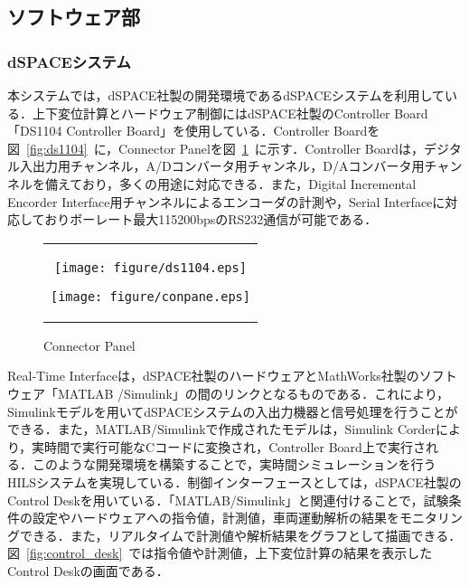 \documentclass[a4paper,12pt]{article_vdlab_sotsuron}
\begin{document}
\newpage
\subsection{ソフトウェア部}
\subsubsection{dSPACEシステム}
本システムでは，dSPACE社製の開発環境であるdSPACEシステムを利用している．上下変位計算とハードウェア制御にはdSPACE社製のController Board「DS1104 Controller Board」を使用している．Controller Boardを図~\ref{fig:ds1104}~に，Connector Panelを図~\ref{fig:conpane}~に示す．Controller Boardは，デジタル入出力用チャンネル，A/Dコンバータ用チャンネル，D/Aコンバータ用チャンネルを備えており，多くの用途に対応できる．また，Digital Incremental Encorder Interface用チャンネルによるエンコーダの計測や，Serial Interfaceに対応しておりボーレート最大115200bpsのRS232通信が可能である．

\vspace{10mm}
\begin{figure}[h]
    \begin{tabular}{c}
      \begin{minipage}{0.5\hsize}
	\begin{center}
	  \texttt{[image: figure/ds1104.eps]}
	  \caption{Controller Borad\cite{6}}
	  \label{fig:ds1104}
	\end{center}
      \end{minipage}
      \begin{minipage}{0.5\hsize}
	\begin{center}
	  \texttt{[image: figure/conpane.eps]}
	  \caption{Connector Panel\cite{6}}
	  \label{fig:conpane}
	\end{center}
      \end{minipage}
    \end{tabular}
\end{figure}

\vspace{10mm}
Real-Time Interfaceは，dSPACE社製のハードウェアとMathWorks社製のソフトウェア「MATLAB /Simulink」の間のリンクとなるものである．これにより，Simulinkモデルを用いてdSPACEシステムの入出力機器と信号処理を行うことができる．また，MATLAB/Simulinkで作成されたモデルは，Simulink Corderにより，実時間で実行可能なCコードに変換され，Controller Board上で実行される．このような開発環境を構築することで，実時間シミュレーションを行うHILSシステムを実現している．制御インターフェースとしては，dSPACE社製のControl Deskを用いている．「MATLAB/Simulink」と関連付けることで，試験条件の設定やハードウェアへの指令値，計測値，車両運動解析の結果をモニタリングできる．また，リアルタイムで計測値や解析結果をグラフとして描画できる．図~\ref{fig:control_desk}~では指令値や計測値，上下変位計算の結果を表示したControl Deskの画面である．
\end{document}
